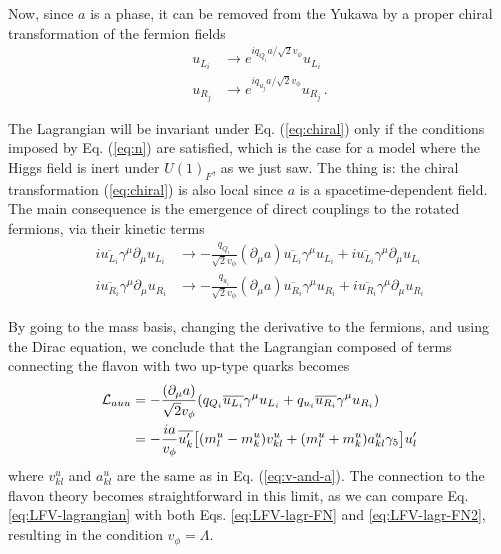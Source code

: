 \documentclass[prd,amsfonts,onecolumn,superscriptaddress,aps,nofootinbib,11pt]{revtex4-1}
\begin{document}
Now, since $a$ is a phase, it can be removed from the Yukawa by a proper chiral transformation of the fermion fields
\begin{equation}\label{eq:chiral}
    \begin{split}
        u_{L_i} &\to e^{i q_{Q_i} a/\sqrt{2}v_\phi} u_{L_i} \\
        u_{R_j} &\to e^{i q_{u_j} a/ \sqrt{2}v_\phi} u_{R_j}\,.
    \end{split}
\end{equation}

The Lagrangian will be invariant under Eq. (\ref{eq:chiral}) only if the conditions imposed by Eq. (\ref{eq:n}) are satisfied, which is the case for a model where the Higgs field is inert under $U(1)_F$, as we just saw. The thing is: the chiral transformation (\ref{eq:chiral}) is also local since $a$ is a spacetime-dependent field. The main consequence is the emergence of direct couplings to the rotated fermions, via their kinetic terms
\begin{equation}
    \begin{split}
        i \overline{u_{L_i}} \gamma^\mu \partial_\mu u_{L_i} &\to -\frac{q_{Q_i}}{\sqrt{2} v_\phi} (\partial_\mu a) \overline{u_{L_i}} \gamma^\mu u_{L_i} + i \overline{u_{L_i}} \gamma^\mu \partial_\mu u_{L_i} \\
        i \overline{u_{R_i}} \gamma^\mu \partial_\mu u_{R_i} &\to -\frac{q_{u_i}}{\sqrt{2} v_\phi} (\partial_\mu a) \overline{u_{R_i}} \gamma^\mu u_{R_i} + i \overline{u_{R_i}} \gamma^\mu \partial_\mu u_{R_i}
    \end{split}
\end{equation}

By going to the mass basis, changing the derivative to the fermions, and using the Dirac equation, we conclude that the Lagrangian composed of terms connecting the flavon with two up-type quarks becomes
\begin{equation}\label{eq:LFV-lagr-FN2}
    \begin{split}
        \mathcal{L}_{auu} &= -\frac{(\partial_\mu a)}{\sqrt{2}v_\phi} \qty(q_{Q_i} \overline{u_{L_i}} \gamma^\mu u_{L_i} + q_{u_i} \overline{u_{R_i}} \gamma^\mu u_{R_i}) \\
        &= -\frac{ia}{v_\phi}\overline{u_k^\prime} \big[ (m_l^u-m_k^u)v_{kl}^u + (m_l^u + m_k^u)a_{kl}^u \gamma_5 \big] u_l^\prime
    \end{split}
\end{equation}
where $v^u_{kl}$ and $a^u_{kl}$ are the same as in Eq. (\ref{eq:v-and-a}). The connection to the flavon theory becomes straightforward in this limit, as we can compare Eq. \eqref{eq:LFV-lagrangian} with both Eqs. \eqref{eq:LFV-lagr-FN} and \eqref{eq:LFV-lagr-FN2}, resulting in the condition $v_\phi = \Lambda$.
\end{document}
